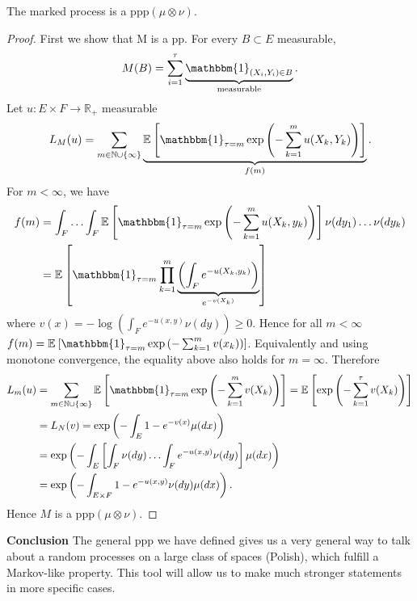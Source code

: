 \begin{theorem}[]
	The marked process is a ppp$(\mu \otimes \nu )$.
\end{theorem}
\begin{proof}
	First we show that M is a pp. For every $B \subset E$ measurable,
	\begin{align}
		M(B) = \sum_{i=1}^{\tau} \underbrace{\mathbbm{1}_{(X_i,Y_i)\in B}}_{\textrm{measurable}}. 
	\end{align}
Let $u:E\times F \to \mathbb{R}_+$ measurable
\begin{align}
	L_M(u) = \sum_{m \in \mathbb{N} \cup \{\infty \}}^{} \underbrace{\mathbb{E}_{} \left[ \mathbbm{1}_{\tau = m} \exp \left(- \sum_{k=1}^{m} u(X_k, Y_k) \right) \right] }_{f(m)}.
\end{align}
For $m<\infty $, we have
\begin{align}
	f(m) &= \int_{F}^{} \ldots \int_{F}^{} \mathbb{E}_{} \left[ \mathbbm{1}_{\tau=m} \exp\left(-\sum_{k=1}^{m} u(X_k, y_k)\right) \right] \nu(dy_1)\ldots \nu(dy_k) \\
	     &= \mathbb{E}_{} \left[ \mathbbm{1}_{\tau = m} \prod_{k=1}^{m}\underbrace{\left( \int_{F}^{} e^{-u(X_k, y_k)}\right)}_{e^{-v(X_k)}} \right] 
\end{align}
where $v(x) = -\log\left(\int_{F}^{} e^{-u(x,y)}\nu(dy) \right) \geq 0$. Hence for all $m < \infty $ $f(m) = \mathbb{E}_{} \left[ \mathbbm{1}_{\tau = m} \exp\left( - \sum_{k=1}^{m} v(x_k)\right) \right] $. Equivalently and using monotone convergence, the equality above also holds for $m=\infty $. Therefore
\begin{align}
	L_m(u) &= \sum_{m \in \mathbb{N}\cup \{\infty \}}^{} \mathbb{E}_{} \left[ \mathbbm{1}_{\tau=m} \exp\left(-\sum_{k=1}^{m} v(X_k) \right) \right] = \mathbb{E}_{} \left[ \exp\left( - \sum_{k=1}^{\tau} v(X_k) \right) \right] \\
	       &= L_{N}(v) = \exp \left( - \int_{E}^{} 1 - e^{-v(x)} \mu (dx) \right) \\
	       &= \exp \left( - \int_{E}^{} \left[ \int_{F}^{} \nu (dy) \ldots \int_{F}^{} e^{-u(x,y)} \nu (dy) \right] \mu (dx) \right) \\
	       &= \exp \left( - \int_{E \times F}^{} 1-e^{-u(x,y)} \nu (dy) \mu (dx) \right).
\end{align}
Hence $M$ is a ppp$(\mu \otimes \nu )$.
\end{proof}


\noindent \textbf{Conclusion} The general ppp we have defined gives us a very general way to talk about a random processes on a large class of spaces (Polish), which fulfill a Markov-like property. This tool will allow us to make much stronger statements in more specific cases.

